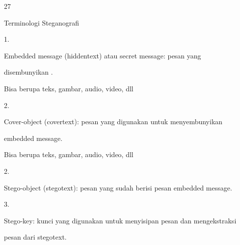 \documentclass{article}
\begin{document}

27

Terminologi Steganografi

1.

Embedded message (hiddentext) atau secret message: pesan yang 

disembunyikan .


Bisa berupa teks, gambar, audio, video, dll

2.

Cover-object (covertext): pesan yang digunakan untuk menyembunyikan 

embedded message.


Bisa berupa teks, gambar, audio, video, dll

2.

Stego-object (stegotext): pesan  yang sudah berisi pesan embedded message.

3.

Stego-key: kunci yang digunakan untuk menyisipan pesan dan mengekstraksi 

pesan dari stegotext.
\end{document}
